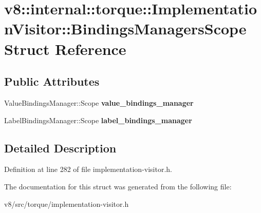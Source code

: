 \hypertarget{structv8_1_1internal_1_1torque_1_1ImplementationVisitor_1_1BindingsManagersScope}{}\section{v8\+:\+:internal\+:\+:torque\+:\+:Implementation\+Visitor\+:\+:Bindings\+Managers\+Scope Struct Reference}
\label{structv8_1_1internal_1_1torque_1_1ImplementationVisitor_1_1BindingsManagersScope}
\subsection*{Public Attributes}
\begin{DoxyCompactItemize}
\item 
\mbox{\label{structv8_1_1internal_1_1torque_1_1ImplementationVisitor_1_1BindingsManagersScope_af4115d6067ceb120cddf2f92bc7b405c}} 
Value\+Bindings\+Manager\+::\+Scope {\bfseries value\+\_\+bindings\+\_\+manager}
\item 
\mbox{\label{structv8_1_1internal_1_1torque_1_1ImplementationVisitor_1_1BindingsManagersScope_ab5220e8b80cb72aefc646b3f0aae8075}} 
Label\+Bindings\+Manager\+::\+Scope {\bfseries label\+\_\+bindings\+\_\+manager}
\end{DoxyCompactItemize}


\subsection{Detailed Description}


Definition at line 282 of file implementation-\/visitor.\+h.



The documentation for this struct was generated from the following file\+:\begin{DoxyCompactItemize}
\item 
v8/src/torque/implementation-\/visitor.\+h\end{DoxyCompactItemize}
